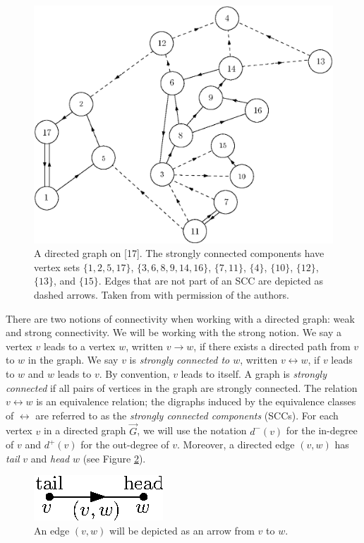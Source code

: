 \begin{figure}
    \centering
    \includegraphics[scale=0.6]{Content/Pictures/Fig1.eps}
    \caption{A directed graph on [17]. The strongly connected components have vertex sets $\{1,2,5,17\}$, $\{3,6,8,9,14,16\}$, $\{7,11\}$, $\{4\}$, $\{10\}$, $\{12\}$, $\{13\}$, and $\{15\}$. Edges that are not part of an SCC are depicted as dashed arrows. Taken from \cite{goldschmidtScalingLimitCritical2021} with permission of the authors.}
    \label{fig.SCCs}
\end{figure}

There are two notions of connectivity when working with a directed graph: weak and strong connectivity. We will be working with the strong notion. We say a vertex $v$ leads to a vertex $w$, written $v \rightarrow w$, if there exists a directed path from $v$ to $w$ in the graph. We say $v$ is \emph{strongly connected to $w$}, written $v \leftrightarrow w$, if $v$ leads to $w$ and $w$ leads to $v$. By convention, $v$ leads to itself. A graph is \emph{strongly connected} if all pairs of vertices in the graph are strongly connected. The relation $v \leftrightarrow w$ is an equivalence relation; the digraphs induced by the equivalence classes of $\leftrightarrow$ are referred to as the \emph{strongly connected components} (SCCs). For each vertex $v$ in a directed graph $\vec{G}$, we will use the notation $d^-(v)$ for the in-degree of $v$ and $d^+(v)$ for the out-degree of $v$. Moreover, a directed edge $(v,w)$ has \emph{tail} $v$ and \emph{head} $w$ (see Figure \ref{fig.tailhead}).
\begin{figure}
    \centering
    \includegraphics{Content/Pictures/Fig2.eps}
    \caption{An edge $(v,w)$ will be depicted as an arrow from $v$ to $w$.}\label{fig.tailhead}
\end{figure}


